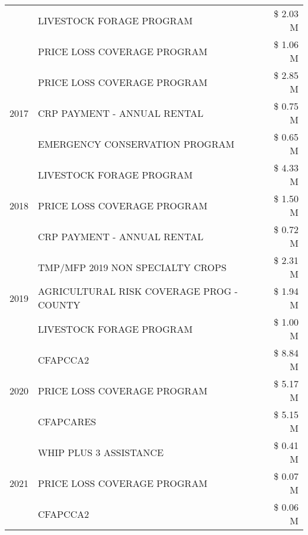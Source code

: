 \begin{tabular}{llr}
 & LIVESTOCK FORAGE PROGRAM & \$ 2.03 M \\
 & PRICE LOSS COVERAGE PROGRAM & \$ 1.06 M \\
\cline{1-3}
\multirow[t]{3}{*}{2017} & PRICE LOSS COVERAGE PROGRAM & \$ 2.85 M \\
 & CRP PAYMENT - ANNUAL RENTAL & \$ 0.75 M \\
 & EMERGENCY CONSERVATION PROGRAM & \$ 0.65 M \\
\cline{1-3}
\multirow[t]{3}{*}{2018} & LIVESTOCK FORAGE PROGRAM & \$ 4.33 M \\
 & PRICE LOSS COVERAGE PROGRAM & \$ 1.50 M \\
 & CRP PAYMENT - ANNUAL RENTAL & \$ 0.72 M \\
\cline{1-3}
\multirow[t]{3}{*}{2019} & TMP/MFP 2019 NON SPECIALTY CROPS & \$ 2.31 M \\
 & AGRICULTURAL RISK COVERAGE PROG - COUNTY & \$ 1.94 M \\
 & LIVESTOCK FORAGE PROGRAM & \$ 1.00 M \\
\cline{1-3}
\multirow[t]{3}{*}{2020} & CFAPCCA2 & \$ 8.84 M \\
 & PRICE LOSS COVERAGE PROGRAM & \$ 5.17 M \\
 & CFAPCARES & \$ 5.15 M \\
\cline{1-3}
\multirow[t]{3}{*}{2021} & WHIP PLUS 3 ASSISTANCE & \$ 0.41 M \\
 & PRICE LOSS COVERAGE PROGRAM & \$ 0.07 M \\
 & CFAPCCA2 & \$ 0.06 M \\
\cline{1-3}
\bottomrule
\end{tabular}
